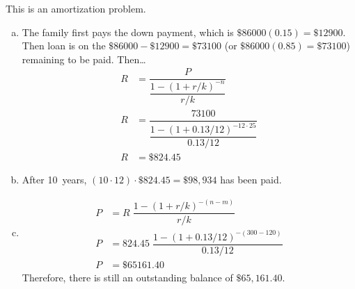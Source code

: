 \documentclass[11pt,letterpaper]{article}
\begin{document}
\sol This is an amortization problem.
\begin{enumerate}[(a)]
\item The family first pays the down payment, which is $\$86000(0.15)= \$12900$. Then loan is on the $\$86000 - \$12900= \$73100$ (or $\$86000(0.85)= \$73100$) remaining to be paid. Then\dots
	\[
	\begin{aligned}
	R&= \dfrac{P}{\dfrac{1 - (1 + r/k)^{-n}}{r/k}} \\
	R&= \dfrac{73100}{\dfrac{1 - (1 + 0.13/12)^{-12 \cdot 25}}{0.13/12}} \\
	R&= \$824.45
	\end{aligned}
	\] \pspace

\item After 10~years, $(10 \cdot 12) \cdot \$824.45= \$98,934$ has been paid. \pspace

\item 
	\[
	\begin{aligned}
	P&= R\; \dfrac{1 - (1 + r/k)^{-(n - m)}}{r/k} \\
	P&= 824.45\; \dfrac{1 - (1 + 0.13/12)^{-(300 - 120)}}{0.13/12} \\
	P&= \$65161.40
	\end{aligned}
	\]
Therefore, there is still an outstanding balance of $\$65,161.40$. 
\end{enumerate}
\end{document}
